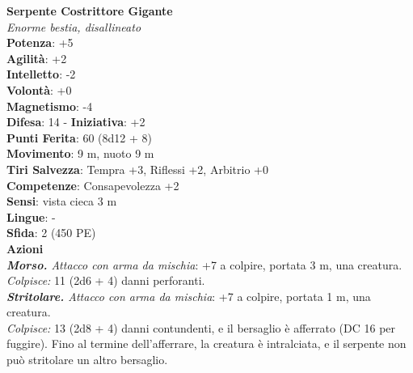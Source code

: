 \begin{multicols}{2}
\medskip\textbf{Serpente Costrittore Gigante}\\
\emph{Enorme bestia, disallineato}\\
\textbf{Potenza}: +5\\
\textbf{Agilità}: +2\\
\textbf{Intelletto}: -2\\
\textbf{Volontà}: +0\\
\textbf{Magnetismo}: -4\\
\textbf{Difesa}: 14 - \textbf{Iniziativa}: +2\\
\textbf{Punti Ferita}: 60 (8d12 + 8)\\
\textbf{Movimento}: 9 m, nuoto 9 m\\
\textbf{Tiri Salvezza}: Tempra +3, Riflessi +2, Arbitrio +0\\
\textbf{Competenze}: Consapevolezza +2\\
\textbf{Sensi}: vista cieca 3 m\\
\textbf{Lingue}: -\\
\textbf{Sfida}: 2 (450 PE)\smallskip\\
\smallskip\textbf{Azioni}\\
\emph{\textbf{Morso.} Attacco con arma da mischia}: +7 a colpire, portata 3 m, una creatura.\\
\emph{Colpisce:} 11 (2d6 + 4) danni perforanti.\\
\emph{\textbf{Stritolare.} Attacco con arma da mischia}: +7 a colpire, portata 1 m, una creatura.\\
\emph{Colpisce:} 13 (2d8 + 4) danni contundenti, e il bersaglio è afferrato (DC 16 per fuggire). Fino al termine dell'afferrare, la creatura è intralciata, e il serpente non può stritolare un altro bersaglio.\\



\end{multicols}
